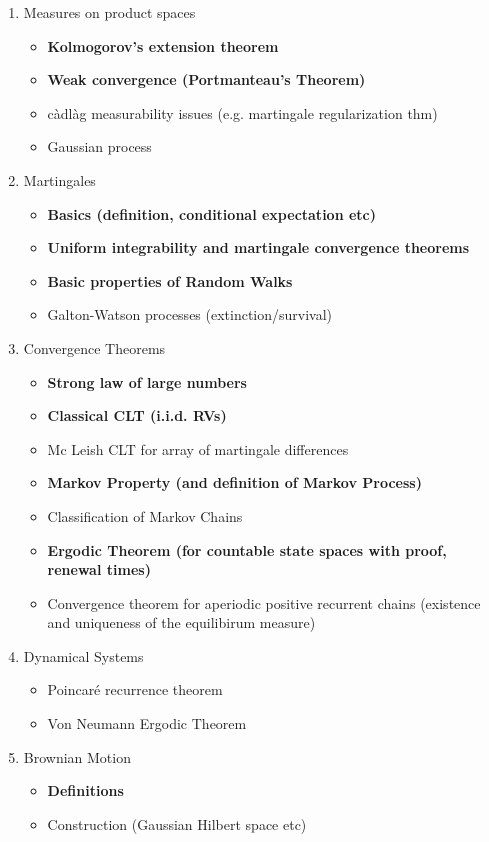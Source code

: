 \documentclass[11pt,a4paper, final]{article}
\theoremstyle{definition}
\begin{document}
\begin{enumerate}
\item Measures on product spaces
\begin{itemize}
\item \textbf{Kolmogorov's extension theorem}
\item \textbf{Weak convergence (Portmanteau's Theorem)}
\item càdlàg measurability issues (e.g. martingale regularization thm)
\item Gaussian process 
\end{itemize}
\item Martingales
\begin{itemize}
\item \textbf{Basics (definition, conditional expectation etc)}
\item \textbf{Uniform integrability and martingale convergence theorems}
\item \textbf{Basic properties of Random Walks}
\item Galton-Watson processes (extinction/survival)
\end{itemize}
\item Convergence Theorems
\begin{itemize}
\item \textbf{Strong law of large numbers}
\item \textbf{Classical CLT (i.i.d. RVs)}
\item Mc Leish CLT for array of martingale differences
\item \textbf{Markov Property (and definition of Markov Process)}
\item Classification of Markov Chains
\item \textbf{Ergodic Theorem (for countable state spaces with proof, renewal times)}
\item Convergence theorem for aperiodic positive recurrent chains (existence and uniqueness of the equilibirum measure)
\end{itemize}
\item Dynamical Systems
\begin{itemize}
\item Poincaré recurrence theorem
\item Von Neumann Ergodic Theorem
\end{itemize}
\item Brownian Motion
\begin{itemize}
\item \textbf{Definitions}
\item Construction (Gaussian Hilbert space etc)

\end{itemize}
\end{enumerate}
\end{document}
